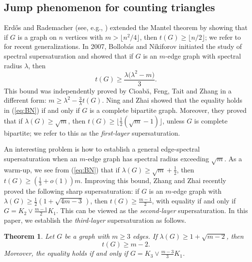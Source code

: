 \documentclass[11pt,a4paper]{article}
\newtheorem{theorem}{Theorem}[section]
\theoremstyle{definition}
\theoremstyle{plain}
\renewcommand{\geq}{\geqslant}
\renewcommand{\ge}{\geqslant}
\begin{document}
\subsection{Jump phenomenon for counting triangles}


Erd\H{o}s and Rademacher (see, e.g.,  \cite{Erd1955,Erdos1964}) extended the Mantel theorem by showing that  
if $G$ is a graph on $n$ vertices with 
$m> \lfloor n^2/4 \rfloor$, 
then $t(G) \ge \lfloor {n}/{2}\rfloor$; we refer to \cite{LPS2020,XK2021,LM2022-Erd-Rad,BC2023} for recent generalizations.  
In 2007, Bollob\'as and Nikiforov
\cite{BollobasNikiforov2007} initiated the study of spectral supersaturation and showed that 
if $G$ is an $m$-edge graph with spectral radius $\lambda$, then 
\begin{equation} 
\label{eq:BN}
  t(G) \ge \frac{\lambda \bigl(\lambda^2 - m\bigr)}{3}. 
  \end{equation}
  This bound was independently proved by 
  Cioab\u{a}, Feng, Tait and Zhang \cite[Lemma 7]{CFTZ20} in a different form: $m \ge \lambda^2- \frac{3}{\lambda}t(G)$. 
Ning and Zhai \cite{NingZhai2023} showed that the equality holds in (\ref{eq:BN}) if and only if $G$ is a complete bipartite graph.  
Moreover, they proved that if $\lambda(G)\geq \sqrt m$, then $t(G)\ge \lfloor \frac{1}{2} (\sqrt{m}-1) \rfloor$, unless  $G$ is complete bipartite;  
we refer to this as the {\it first-layer} supersaturation. 


\smallskip 
An interesting problem is how to establish a general edge-spectral supersaturation when an $m$-edge graph has spectral radius exceeding $\sqrt{m}$. 
As a warm-up, we see from (\ref{eq:BN}) 
that if $\lambda (G)\ge \sqrt{m} + \frac{1}{2}$, then $t(G)\ge \left( \frac{1}{3} + o(1) \right)m$.  
Improving this bound, 
Zhang and Zhai \cite{ZZ2026} recently proved the following sharp supersaturation: if $G$ is an $m$-edge graph with $\lambda (G)\ge \frac{1}{2} (1+ \sqrt{4m-3}\,)$, then 
$ t(G) \ge \frac{m-1}{2}$,  
with equality if and only if 
$G=K_2\vee \frac{m-1}{2}K_1$. This can be viewed as the {\it second-layer} supersaturation.  
In this paper, we establish the {\it third-layer}   supersaturation as follows. 

\begin{theorem} \label{thm:m-2}
Let $G$ be a graph with $m\ge 3$ edges.  If
$\lambda(G)\ge 1+\sqrt{m-2}$, 
then 
\[
        t(G)\ge m-2.
\]
Moreover, the equality holds if and only if
       $G=K_3\vee \frac{m-3}{3}K_1$. 
\end{theorem}
\end{document}
